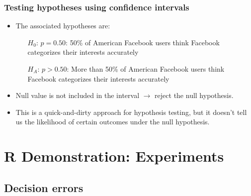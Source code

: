 \documentclass[t,compress,mathserif]{beamer}
\begin{document}
\begin{frame}
\frametitle{Testing hypotheses using confidence intervals}

{\small {}}

\pause

\begin{itemize}

\item The associated hypotheses are:
\begin{itemize}
\item[$H_0$:] $p = 0.50$: 50\% of American Facebook users think Facebook categorizes their interests accurately
\item[$H_A$:] $p > 0.50$: More than 50\% of American Facebook users think Facebook categorizes their interests accurately
\end{itemize}

\pause

\item Null value is not included in the interval $\rightarrow$ reject the null hypothesis.

\pause

\item This is a quick-and-dirty approach for hypothesis testing, but it doesn't tell us the likelihood of certain outcomes under the null hypothesis.

\end{itemize}

\end{frame}


\section{R Demonstration: Experiments}


\subsection{Decision errors}

\end{document}
